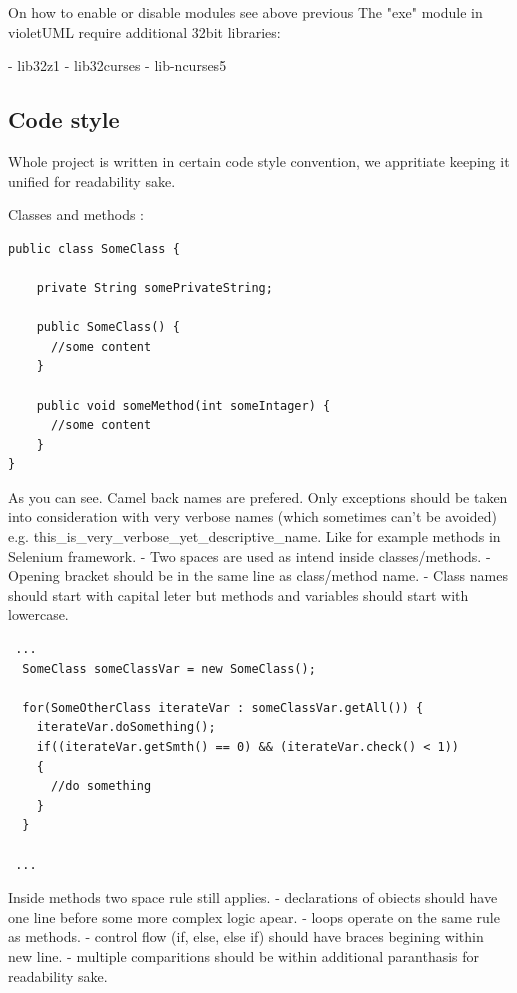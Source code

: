 \documentclass{article}
\begin{document}
On how to enable or disable modules see above previous
The "exe" module in violetUML require additional 32bit libraries:

- lib32z1\newline
- lib32curses\newline
- lib-ncurses5\newline


\subsection{Code style}

Whole project is written in certain code style convention, we appritiate keeping it unified for readability sake.

Classes and methods :
\begin{lstlisting}
public class SomeClass {

    private String somePrivateString;

    public SomeClass() {
      //some content
    }

    public void someMethod(int someIntager) {
      //some content
    }
}
\end{lstlisting}

As you can see. Camel back names are prefered. Only exceptions should be taken into consideration with very verbose names (which sometimes
can't be avoided) e.g. this\_is\_very\_verbose\_yet\_descriptive\_name. Like for example methods in Selenium framework.\newline
- Two spaces are used as intend inside classes/methods.\newline
- Opening bracket should be in the same line as class/method name.\newline
- Class names should start with capital leter but methods and variables should start with lowercase.\newline

\begin{lstlisting}
 ...
  SomeClass someClassVar = new SomeClass();
  
  for(SomeOtherClass iterateVar : someClassVar.getAll()) {
    iterateVar.doSomething();
    if((iterateVar.getSmth() == 0) && (iterateVar.check() < 1))
    {
      //do something
    }
  }
  
 ...
\end{lstlisting}

Inside methods two space rule still applies.\newline
- declarations of obiects should have one line before some more complex logic apear.\newline
- loops operate on the same rule as methods.\newline
- control flow (if, else, else if) should have braces begining within new line.\newline
- multiple comparitions should be within additional paranthasis for readability sake.\newline
\end{document}
